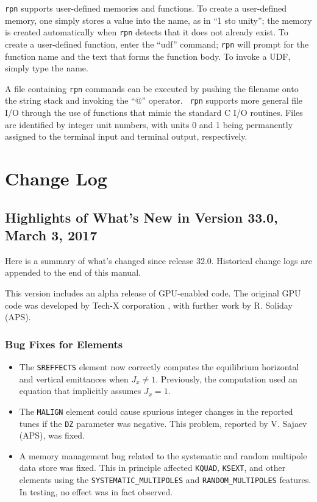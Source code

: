 \documentclass[11pt]{article}
\begin{document}
{\tt rpn} supports user-defined memories and functions.  To create a
user-defined memory, one simply stores a value into the name, as in
``1 sto unity''; the memory is created automatically when {\tt rpn}
detects that it does not already exist.  To create a user-defined
function, enter the ``udf'' command; {\tt rpn} will prompt for the
function name and the text that forms the function body.  To invoke a
UDF, simply type the name.

A file containing {\tt rpn} commands can be executed by pushing the
filename onto the string stack and invoking the ``@'' operator.  {\tt
rpn} supports more general file I/O through the use of functions that
mimic the standard C I/O routines.  Files are identified by integer
unit numbers, with units 0 and 1 being permanently assigned to the
terminal input and terminal output, respectively.

\newpage

\section{Change Log}

\subsection{Highlights of What's New in Version 33.0, March 3, 2017}

Here is a summary of what's changed since release 32.0.
Historical change logs are appended to the end of this manual.

This version includes an alpha release of GPU-enabled code. The original GPU code was developed by 
Tech-X corporation \cite{GPU1}, with further work by R. Soliday (APS).

\subsubsection{Bug Fixes for Elements}

\begin{itemize}
\item The \verb|SREFFECTS| element now correctly computes the equilibrium horizontal and vertical emittances when
  $J_x \neq 1$. Previously, the computation used an equation that implicitly assumes $J_x = 1$.
\item The \verb|MALIGN| element could cause spurious integer changes in the reported tunes if the \verb|DZ| parameter
  was negative. This problem, reported by V. Sajaev (APS), was fixed.
\item A memory management bug related to the systematic and random multipole data store was fixed. This in principle
  affected \verb|KQUAD|, \verb|KSEXT|, and other elements using the \verb|SYSTEMATIC_MULTIPOLES| and \verb|RANDOM_MULTIPOLES|
  features. In testing, no effect was in fact observed.
\end{itemize}
\end{document}

